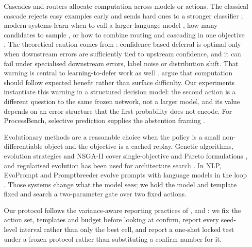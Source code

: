 Cascades and routers allocate computation across models or actions. The
classical cascade rejects easy examples early and sends hard ones to a stronger
classifier \citep{viola2001rapid}; modern systems learn when to call a larger
language model \citep{chen2024frugalgpt,aggarwal2024automix,ong2024routellm},
how many candidates to sample \citep{ding2025bestroute}, or how to combine
routing and cascading in one objective \citep{dekoninck2025unified}. The
theoretical caution comes from \citet{jitkrittum2023cascade}: confidence-based
deferral is optimal only when downstream errors are sufficiently tied to
upstream confidence, and it can fail under specialised downstream errors, label
noise or distribution shift. That warning is central to learning-to-defer work
as well \citep{mozannar2020consistent,chuang2025learning}.
\citet{damani2025hard} argue that computation should
follow expected benefit rather than surface difficulty. Our experiments
instantiate this warning in a structured decision model: the second action is a
different question to the same frozen network, not a larger model, and its value
depends on an error structure that the first probability does not encode. For
ProcessBench, selective prediction supplies the abstention framing
\citep{chow1970optimum,geifman2017selective,kamath2020selective,xin2021art}.

Evolutionary methods are a reasonable choice when the policy is a small
non-differentiable object and the objective is a cached replay. Genetic
algorithms, evolution strategies and NSGA-II cover single-objective and Pareto
formulations \citep{deb2002nsga2,hansen2001cmaes,stanley2002neat}, and
regularised evolution has been used for architecture search
\citep{real2019regularized,elsken2019nas}. In NLP, EvoPrompt and Promptbreeder evolve prompts with language models in the loop
\citep{guo2024evoprompt,fernando2024promptbreeder}. Those systems change what the
model sees; we hold the model and template fixed and search a two-parameter gate
over two fixed actions.

Our protocol follows the variance-aware reporting practices of
\citet{henderson2018matters}, \citet{bouthillier2021variance} and
\citet{dodge2019show}: we fix the action set, templates and budget before
looking at confirm, report every seed-level interval rather than only the best
cell, and report a one-shot locked test under a frozen protocol rather than
substituting a confirm number for it.
